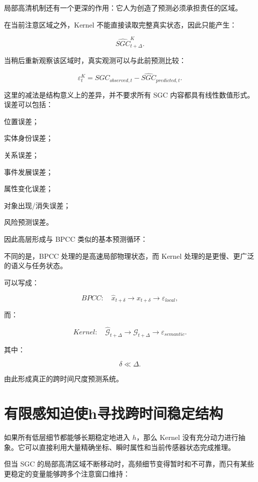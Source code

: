 局部高清机制还有一个更深的作用：它人为创造了预测必须承担责任的区域。

在当前注意区域之外，Kernel 不能直接读取完整真实状态，因此只能产生：

\[
\hat{SGC}_{t+\Delta}^{K}.
\]

当稍后重新观察该区域时，真实观测可以与此前预测比较：

\[
\boxed{
\varepsilon_t^{K}
=
SGC_{observed,t}
-
\hat{SGC}_{predicted,t}.
}
\]

这里的减法是结构意义上的差异，并不要求所有 SGC 内容都具有线性数值形式。误差可以包括：

位置误差；

实体身份误差；

关系误差；

事件发展误差；

属性变化误差；

对象出现/消失误差；

风险预测误差。

因此高层形成与 BPCC 类似的基本预测循环：

\begin{statementbox}
\centering
{}
\end{statementbox}

不同的是，BPCC 处理的是高速局部物理状态，而 Kernel 处理的是更慢、更广泛的语义与任务状态。

可以写成：

\[
BPCC:
\quad
\hat x_{t+\delta}
\rightarrow
x_{t+\delta}
\rightarrow
\varepsilon_{local},
\]

而：

\[
Kernel:
\quad
\hat{\mathcal G}_{t+\Delta}
\rightarrow
\mathcal G_{t+\Delta}
\rightarrow
\varepsilon_{semantic}.
\]

其中：

\[
\delta\ll\Delta.
\]

由此形成真正的跨时间尺度预测系统。

\section{有限感知迫使h寻找跨时间稳定结构}

如果所有低层细节都能够长期稳定地进入 $h$，那么 Kernel 没有充分动力进行抽象。它可以直接利用大量精确坐标、瞬时属性和当前传感器状态完成推理。

但当 SGC 的局部高清区域不断移动时，高频细节变得暂时和不可靠，而只有某些更稳定的变量能够跨多个注意窗口维持：

